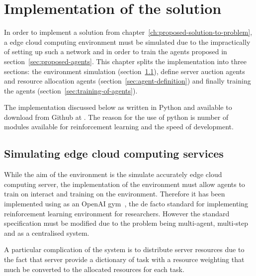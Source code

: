 \chapter{Implementation of the solution}\label{ch:implementation-of-the-solution}
In order to implement a solution from chapter~\ref{ch:proposed-solution-to-problem}, a edge cloud computing environment
must be simulated due to the impractically of setting up such a network and in order to train the agents proposed
in section~\ref{sec:proposed-agents}. This chapter splits the implementation into three sections: the environment
simulation (section~\ref{sec:simulating-edge-cloud-computing-services}), define server auction agents and resource
allocation agents (section~\ref{sec:agent-definition}) and finally training the agents
(section~\ref{sec:training-of-agents}).

The implementation discussed below as written in Python and available to download from Github at
. The reason for the use of python is number
of modules available for reinforcement learning and the speed of development.

\section{Simulating edge cloud computing services}\label{sec:simulating-edge-cloud-computing-services}
While the aim of the environment is the simulate accurately edge cloud computing server, the implementation of the
environment must allow agents to train on interact and training on the environment. Therefore it has been implemented
using as an OpenAI gym~\citep{openaigym}, the de facto standard for implementing reinforcement learning
environment for researchers. However the standard specification must be modified due to the problem being multi-agent,
multi-step and as a centralised system.

A particular complication of the system is to distribute server resources due to the fact that server provide a
dictionary of task with a resource weighting that much be converted to the allocated resources for each task.


